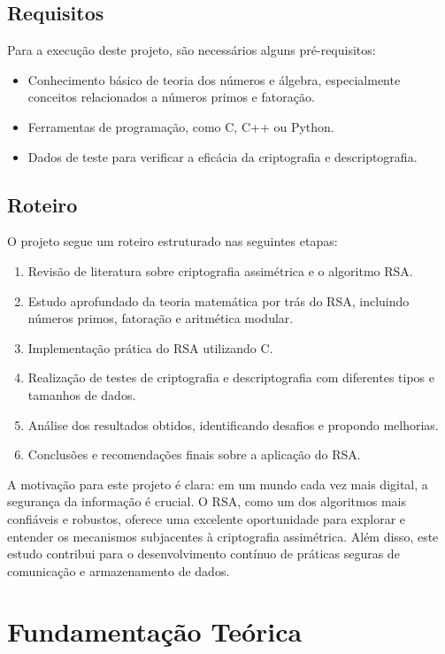 \documentclass[a4paper,12pt]{article}
\begin{document}
\subsection*{Requisitos}
Para a execução deste projeto, são necessários alguns pré-requisitos:
\begin{itemize}
    \item Conhecimento básico de teoria dos números e álgebra, especialmente conceitos relacionados a números primos e fatoração.
    \item Ferramentas de programação, como C, C++ ou Python.
    \item Dados de teste para verificar a eficácia da criptografia e descriptografia.
\end{itemize}

\subsection*{Roteiro}
O projeto segue um roteiro estruturado nas seguintes etapas:
\begin{enumerate}
    \item Revisão de literatura sobre criptografia assimétrica e o algoritmo RSA.
    \item Estudo aprofundado da teoria matemática por trás do RSA, incluindo números primos, fatoração e aritmética modular.
    \item Implementação prática do RSA utilizando C.
    \item Realização de testes de criptografia e descriptografia com diferentes tipos e tamanhos de dados.
    \item Análise dos resultados obtidos, identificando desafios e propondo melhorias.
    \item Conclusões e recomendações finais sobre a aplicação do RSA.
\end{enumerate}

A motivação para este projeto é clara: em um mundo cada vez mais digital, a segurança da informação é crucial. O RSA, como um dos algoritmos mais confiáveis e robustos, oferece uma excelente oportunidade para explorar e entender os mecanismos subjacentes à criptografia assimétrica. Além disso, este estudo contribui para o desenvolvimento contínuo de práticas seguras de comunicação e armazenamento de dados.

\section*{Fundamentação Teórica}
\end{document}
